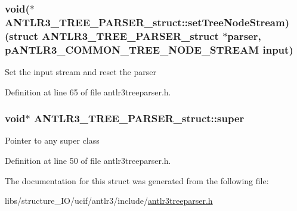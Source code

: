\hypertarget{struct_a_n_t_l_r3___t_r_e_e___p_a_r_s_e_r__struct_adb9beda70b2f18a08f6d9ed1ba93176b}{
\subsubsection[{set\-Tree\-Node\-Stream}]{\setlength{\rightskip}{0pt plus 5cm}void($\ast$ A\-N\-T\-L\-R3\-\_\-\-T\-R\-E\-E\-\_\-\-P\-A\-R\-S\-E\-R\-\_\-struct\-::set\-Tree\-Node\-Stream)(struct {\bf A\-N\-T\-L\-R3\-\_\-\-T\-R\-E\-E\-\_\-\-P\-A\-R\-S\-E\-R\-\_\-struct} $\ast$parser, {\bf p\-A\-N\-T\-L\-R3\-\_\-\-C\-O\-M\-M\-O\-N\-\_\-\-T\-R\-E\-E\-\_\-\-N\-O\-D\-E\-\_\-\-S\-T\-R\-E\-A\-M} input)}}\label{struct_a_n_t_l_r3___t_r_e_e___p_a_r_s_e_r__struct_adb9beda70b2f18a08f6d9ed1ba93176b}
Set the input stream and reset the parser 

Definition at line 65 of file antlr3treeparser.\-h.

\hypertarget{struct_a_n_t_l_r3___t_r_e_e___p_a_r_s_e_r__struct_a747c1447b7ef0fc45034c6f25e1fdac0}{
\subsubsection[{super}]{\setlength{\rightskip}{0pt plus 5cm}void$\ast$ A\-N\-T\-L\-R3\-\_\-\-T\-R\-E\-E\-\_\-\-P\-A\-R\-S\-E\-R\-\_\-struct\-::super}}\label{struct_a_n_t_l_r3___t_r_e_e___p_a_r_s_e_r__struct_a747c1447b7ef0fc45034c6f25e1fdac0}
Pointer to any super class 

Definition at line 50 of file antlr3treeparser.\-h.



The documentation for this struct was generated from the following file\-:\begin{DoxyCompactItemize}
\item 
libs/structure\-\_\-\-I\-O/ucif/antlr3/include/\hyperlink{antlr3treeparser_8h}{antlr3treeparser.\-h}\end{DoxyCompactItemize}

